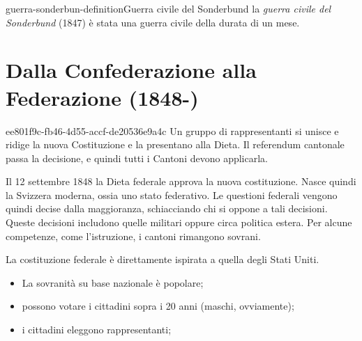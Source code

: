 \documentclass[preview]{standalone}
\begin{document}
\begin{snippetdefinition}{guerra-sonderbun-definition}{Guerra civile del Sonderbund}
    la \textit{guerra civile del Sonderbund} (1847) è stata una guerra civile
    della durata di un mese.
\end{snippetdefinition}


\section{Dalla Confederazione alla Federazione (1848-)}

\begin{snippet}{ee801f9c-fb46-4d55-accf-de20536e9a4c}
    Un gruppo di rappresentanti si unisce e ridige la nuova Costituzione e la presentano alla Dieta.
    Il referendum cantonale passa la decisione, e quindi tutti i Cantoni devono applicarla.
    
    Il 12 settembre 1848 la Dieta federale approva la nuova costituzione.
    Nasce quindi la Svizzera moderna, ossia uno stato federativo.
    Le questioni federali vengono quindi decise dalla maggioranza, schiacciando chi si oppone a tali decisioni.
    Queste decisioni includono quelle militari oppure circa politica estera.
    Per alcune competenze, come l'istruzione, i cantoni rimangono sovrani.
    
    La costituzione federale è direttamente ispirata a quella degli Stati Uniti.
    \begin{itemize}
        \item La sovranità su base nazionale è popolare;
        \item possono votare i cittadini sopra i 20 anni (maschi, ovviamente);
        \item i cittadini eleggono rappresentanti;
    \end{itemize}
    
\end{snippet}
\end{document}
